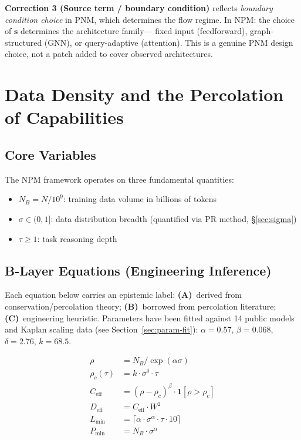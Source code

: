 \documentclass[11pt,a4paper]{article}
\newcommand{\Ceff}{C_{\text{eff}}}
\newcommand{\Deff}{D_{\text{eff}}}
\begin{document}
\textbf{Correction 3 (Source term / boundary condition)} reflects
\emph{boundary condition choice} in PNM, which determines the flow regime.
In NPM: the choice of $\mathbf{s}$ determines the architecture family---
fixed input (feedforward), graph-structured (GNN), or query-adaptive (attention).
This is a genuine PNM design choice, not a patch added to cover observed architectures.

\section{Data Density and the Percolation of Capabilities}

\subsection{Core Variables}

The NPM framework operates on three fundamental quantities:
\begin{itemize}[leftmargin=*]
  \item $N_B = N / 10^9$: training data volume in billions of tokens
  \item $\sigma \in (0,1]$: data distribution breadth (quantified via PR method, \S\ref{sec:sigma})
  \item $\tau \geq 1$: task reasoning depth
\end{itemize}

\subsection{B-Layer Equations (Engineering Inference)}
\label{sec:blayer}

Each equation below carries an epistemic label:
\textbf{(A)}~derived from conservation/percolation theory;
\textbf{(B)}~borrowed from percolation literature;
\textbf{(C)}~engineering heuristic.
Parameters have been fitted against 14 public models and Kaplan scaling data
(see Section~\ref{sec:param-fit}):
$\alpha=0.57$, $\beta=0.068$, $\delta=2.76$, $k=68.5$.

\begin{align}
  \rho &= N_B / \exp(\alpha \sigma) \label{eq:density} \\
  \rho_c(\tau) &= k \cdot \sigma^\delta \cdot \tau \label{eq:critical} \\
  \Ceff &= (\rho - \rho_c)^\beta \cdot \mathbf{1}[\rho > \rho_c] \label{eq:ceff} \\
  \Deff &= \Ceff \cdot W^2 \label{eq:deff} \\
  L_{\min} &= \lceil \alpha \cdot \sigma^\alpha \cdot \tau \cdot 10 \rceil \label{eq:lmin} \\
  P_{\min} &= N_B \cdot \sigma^\alpha \label{eq:pmin}
\end{align}
\end{document}
